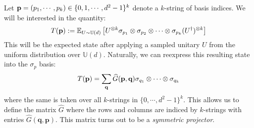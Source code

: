 \documentclass[12pt]{amsart}
\theoremstyle{definition}
\theoremstyle{remark}
\numberwithin{equation}{section}
\theoremstyle{remark}
\begin{document}
\noindent Let ${\bf p} = (p_1, \cdots, p_k) \in \{0,1,\cdots, d^2 -1\}^k$ denote a $k$-string of basis indices. We will be interested in the quantity:
%
\begin{equation} \label{Tdef}
  T({\bf p}) := \mathbb{E}_{U \sim \mathbb{U}(d)} \left[ U^{\otimes k} \sigma_{p_1} \otimes \sigma_{p_2} \otimes \cdots \otimes \sigma_{p_k} (U^\dagger)^{\otimes k} \right]
\end{equation}
This will be the expected state after applying a sampled unitary $U$ from the uniform distribution over $\mathbb{U}(d)$. Naturally, we can reexpress this resulting state into the $\sigma_p$ basis:
%
\begin{equation}
  T({\bf p}) = \sum_{{\bf q}} \widehat{G}(\textbf{p},\textbf{q}) \sigma_{q_1} \otimes \cdots \otimes \sigma_{q_k}
\end{equation}
where the same is taken over all $k$-strings in $\{0, \cdots, d^2-1\}^k$. This allows us to define the matrix $\widehat{G}$ where the rows and columns are indiced by $k$-strings with entries $\widehat{G}(\textbf{q},\textbf{p})$. This matrix turns out to be a \emph{symmetric projector}.
\end{document}
